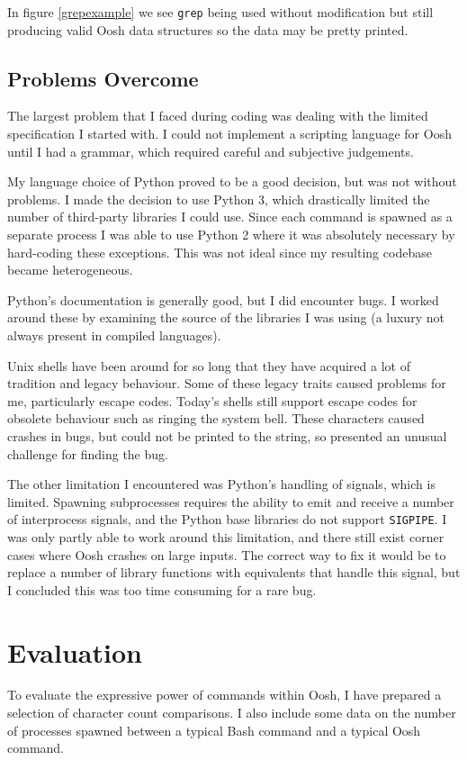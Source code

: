 \documentclass[12pt,twoside,notitlepage]{report}
\begin{document}
In figure \ref{grepexample} we see {\tt grep} being used without
modification but still producing valid Oosh data structures so the
data may be pretty printed.

\section{Problems Overcome}

The largest problem that I faced during coding was dealing with the limited
specification I started with. I could not implement a scripting
language for Oosh until I had a grammar, which required careful and
subjective judgements.

My language choice of Python proved to be a good decision, but was not
without problems. I made the decision to use Python 3, which
drastically limited the number of third-party libraries I could
use. Since each command is spawned as a separate process I was able to
use Python 2 where it was absolutely necessary by hard-coding these
exceptions. This was not ideal since my resulting codebase became
heterogeneous.

Python's documentation is generally good, but I did encounter bugs. I
worked around these by examining the source of the libraries I was
using (a luxury not always present in compiled languages).

Unix shells have been around for so long that they have acquired a lot
of tradition and legacy behaviour. Some of these legacy traits caused
problems for me, particularly escape codes. Today's shells still
support escape codes for obsolete behaviour such as ringing the system
bell. These characters caused crashes in bugs, but could not be
printed to the string, so presented an unusual challenge for finding
the bug.

The other limitation I encountered was Python's handling of signals,
which is limited. Spawning subprocesses requires the ability to emit
and receive a number of interprocess signals, and the Python base
libraries do not support {\tt SIGPIPE}. I was only partly able to work
around this limitation, and there still exist corner cases where Oosh
crashes on large inputs. The correct way to fix it would be to replace
a number of library functions with equivalents that handle this
signal, but I concluded this was too time consuming for a rare bug.

\cleardoublepage

\chapter{Evaluation}
To evaluate the expressive power of commands within Oosh, I have prepared a
selection of character count comparisons. I also include some data on the
number of processes spawned between a typical Bash command and a typical Oosh
command.
\end{document}
